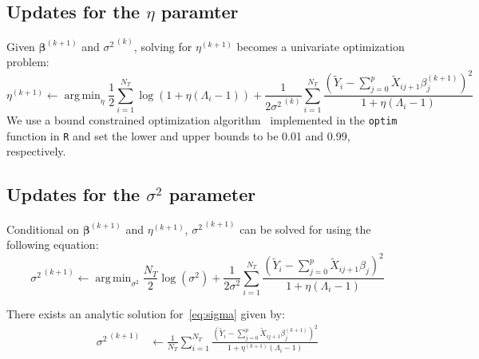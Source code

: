 \documentclass[12pt,letter]{article}\usepackage[]{graphicx}\usepackage[]{color}
\newcommand{\Xtilde}{\widetilde{X}}
\newcommand{\Ytilde}{\widetilde{Y}}
\newcommand{\bTheta}{\boldsymbol{\Theta}}
\newcommand{\bbeta}{\boldsymbol{\beta}}
\DeclareMathOperator*{\argmin}{arg\,min}
\begin{document}

\subsection{Updates for the $\eta$ paramter}
Given $\bbeta^{(k+1)}$ and ${\sigma^2}^{\,(k)}$, solving for $\eta^{(k+1)}$ becomes a univariate optimization problem:
\begin{equation}
	\eta^{(k+1)} \leftarrow \argmin_{\eta}  \frac{1}{2} \sum_{i=1}^{N_T} \log(1 + \eta (\Lambda_i-1)) + \frac{1}{2{\sigma^2}^{\,(k)}} \sum_{i=1}^{N_T}\frac{\left(  \Ytilde_i - \sum_{j=0}^{p}\Xtilde_{ij+1}\beta_j^{(k+1)} \right) ^2}{1 + \eta (\Lambda_i-1)}
\end{equation}
We use a bound constrained optimization algorithm~\citep{byrd1995limited} implemented in the \texttt{optim} function in \texttt{R} and set the lower and upper bounds to be 0.01 and 0.99, respectively.



\subsection{Updates for the $\sigma^2$ parameter}

Conditional on $\bbeta^{(k+1)}$ and $\eta^{(k+1)}$, ${\sigma^2}^{\,(k+1)}$ can be solved for using the following equation:
\begin{equation}
	{\sigma^2}^{\,(k+1)} \leftarrow \argmin_{\sigma^2}  \frac{N_T}{2}\log(\sigma^2) + \frac{1}{2\sigma^2} \sum_{i=1}^{N_T}\frac{\left(  \Ytilde_i - \sum_{j=0}^{p}\Xtilde_{ij+1}\beta_j \right) ^2}{1 + \eta (\Lambda_i-1)} \label{eq:sigma}
\end{equation}

There exists an analytic solution for~\eqref{eq:sigma} given by:
\begin{align}
	{\sigma^2}^{\,(k+1)} & \gets \frac{1}{N_T}\sum_{i=1}^{N_T}\frac{\left(  \Ytilde_i - \sum_{j=0}^{p}\Xtilde_{ij+1}\beta_j^{(k+1)} \right) ^2}{1 + \eta^{(k+1)} (\Lambda_i-1)} \label{eq:sigmahat2}
\end{align}
\end{document}
